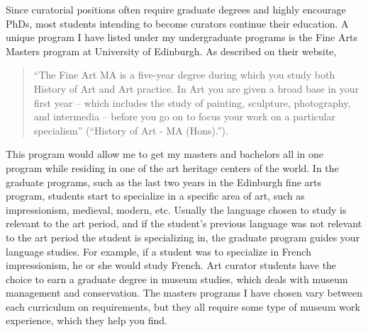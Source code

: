 \begin{multicols}{2}
	Since curatorial positions often require graduate degrees and highly encourage PhDs, most students intending to become curators continue their education. A unique program I have listed under my undergraduate programs is the Fine Arts Masters program at University of Edinburgh. As described on their website, 
	\begin{quote}
		“The Fine Art MA is a five-year degree during which you study both History of Art and Art practice. In Art you are given a broad base in your first year – which includes the study of painting, sculpture, photography, and intermedia – before you go on to focus your work on a particular specialism” (“History of Art - MA (Hons).”). 
	\end{quote}
	This program would allow me to get my masters and bachelors all in one program while residing in one of the art heritage centers of the world. In the graduate programs, such as the last two years in the Edinburgh fine arts program, students start to specialize in a specific area of art, such as impressionism, medieval, modern, etc. Usually the language chosen to study is relevant to the art period, and if the student’s previous language was not relevant to the art period the student is specializing in, the graduate program guides your language studies. For example, if a student was to specialize in French impressionism, he or she would study French. Art curator students have the choice to earn a graduate degree in museum studies, which deals with museum management and conservation. The masters programs I have chosen vary between each curriculum on requirements, but they all require some type of museum work experience, which they help you find. 


\end{multicols}
